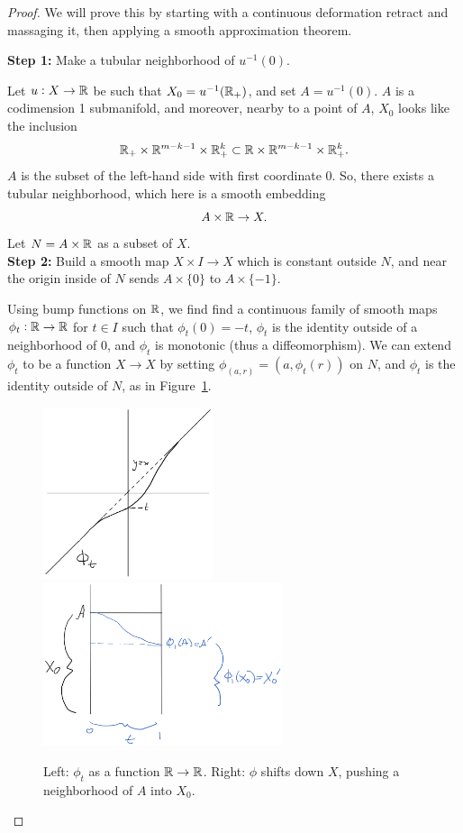 \documentclass{article}
\newtheorem{proposed work}[theorem]{Proposed Work}
\theoremstyle{definition}
\begin{document}
\begin{proof}
  We will prove this by starting with a continuous deformation retract and massaging it, then applying a smooth approximation theorem.

\noindent  \textbf{Step 1:} Make a tubular neighborhood of $u^{-1}(0)$.

  Let $u:X\to \mathbb R$ be such that $X_0=u^{-1}(\mathbb R_+)$, and set $A=u^{-1}(0)$. $A$ is a codimension 1 submanifold, and moreover, nearby to a point of $A$, $X_0$ looks like the inclusion
  \[  
    \mathbb R_+\times \mathbb R^{m-k-1}\times \mathbb R_+^k\subset \mathbb R\times \mathbb R^{m-k-1}\times \mathbb R^k_+.
  \]
  $A$ is the subset of the left-hand side with first coordinate 0. So, there exists a tubular neighborhood, which here is a smooth embedding
  \[
    A\times \mathbb R\to X.
  \]
  Let $N=A\times \mathbb R$ as a subset of $X$.\\

\noindent  \textbf{Step 2:} Build a smooth map $X\times I\to X$ which is constant outside $N$, and near the origin inside of $N$ sends $A\times\{0\}$ to $A\times\{-1\}$.

  Using bump functions on $\mathbb R$, we find find a continuous family of smooth maps $\phi_t:\mathbb R \to \mathbb R$ for $t\in I$ such that $\phi_t(0)=-t$, $\phi_t$ is the identity outside of a neighborhood of $0$, and $\phi_t$ is monotonic (thus a diffeomorphism). We can extend $\phi_t$ to be a function $X\to X$ by setting $\phi_(a,r)=(a,\phi_t(r))$ on $N$, and $\phi_t$ is the identity outside of $N$, as in Figure~\ref{fig:phi_t}.

  \begin{figure}[h]
    
  \centering
\includegraphics[width=5cm]{phi_t_2}
\includegraphics[width=7cm]{phi_t}
\caption{Left: $\phi_t$ as a function $\mathbb R\to\mathbb R$. Right: $\phi$ shifts down $X$, pushing a neighborhood of $A$ into $X_0$.\label{fig:phi_t}}
\end{figure}



\end{proof}
\end{document}
